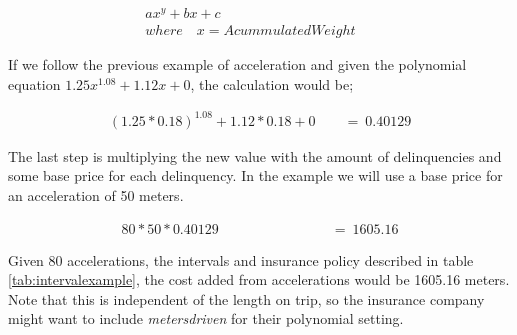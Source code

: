 \begin{align*}
ax^{y} + bx + c\quad \quad \quad \quad \quad \quad \quad \quad \quad \quad \quad \\
where\quad x = AcummulatedWeight
\end{align*}

If we follow the previous example of acceleration and given the polynomial equation $1.25x^{1.08} +  1.12x + 0$, the calculation would be;

\begin{align*}
(1.25 * 0.18)^{1.08} +  1.12 * 0.18 + 0\quad \quad  =\ 0.40129
\end{align*}

The last step is multiplying the new value with the amount of delinquencies and some base price for each delinquency. In the example we will use a base price for an acceleration of 50 meters.

\begin{align*}
80 * 50 * 0.40129\quad \quad \quad \quad \quad \quad \quad \quad =\ 1605.16
\end{align*}


Given 80 accelerations, the intervals and insurance policy described in table \ref{tab:intervalexample}, the cost added from accelerations would be 1605.16 meters. Note that this is independent of the length on trip, so the insurance company might want to include \textit{metersdriven} for their polynomial setting.